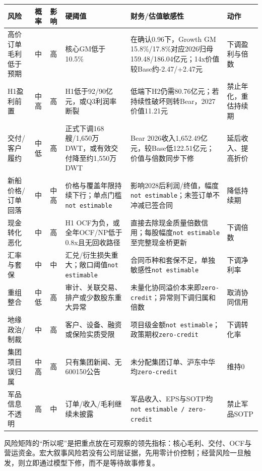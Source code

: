 \begin{exhibitbox}[风险热度与估值传导]
\scriptsize
\begin{tabularx}{\exhibitboxwidth}{L{2.3cm}C{1.2cm}C{1.2cm}L{3.5cm}L{4.0cm}X}
\toprule
\textbf{风险} & \textbf{概率} & \textbf{影响} & \textbf{硬阈值} & \textbf{财务/估值敏感性} & \textbf{动作} \\
\midrule
高价订单毛利低于预期 & 中 & 高 & 核心GM低于10.5\% & 在确认0.96下，Growth GM 15.8\%/17.8\%对应2026归母159.48/186.04亿元；14x价值较Base约-2.47/+2.47元 & 下调盈利与倍数 \\
H1盈利前置 & 中高 & 高 & H1低于92/90亿元，或Q3利润率断裂 & 低端下H2仍需80.76亿元；若持续性破坏则转Bear，2027价值11.21元 & 禁止年化，重估持续期 \\
交付/客户履约 & 中低 & 高 & 正式下调168艘/1,650万DWT，或有效交付降至约1,550万DWT & Bear 2026收入1,652.49亿元，较Base低122.51亿元；价值与倍数同步下修 & 延后收入、提高折价 \\
新船价格/订单回落 & 中 & 中高 & 价格与覆盖年限持续下行；单点门槛\texttt{not estimable} & 影响2028后利润/终值，幅度\texttt{not estimable}；未签订单不冲减已签合同 & 降低持续期 \\
现金转化恶化 & 中 & 高 & H1 OCF为负，或全年OCF/NP低于0.8x且无回收路径 & 直接去除现金质量倍数信用；每股幅度\texttt{not estimable}至完整现金桥更新 & 下调倍数 \\
汇率与套保 & 中 & 中 & 汇兑/衍生损失重大；敞口阈值\texttt{not estimable} & 合同币种和套保不足，单独敏感性\texttt{not estimable} & 下调净利率 \\
重组整合 & 中低 & 高 & 审计、关联交易、排产或少数股东重大异常 & 未量化协同溢价本来即\texttt{zero-credit}；异常则下调归属和倍数 & 取消协同信用 \\
地缘政治/制裁 & 中 & 高 & 客户、设备、融资或保险实质受限 & 项目级金额\texttt{not estimable}；政策期权\texttt{zero-credit} & 下调转化率 \\
集团项目误归属 & 中高 & 高 & 只有集团新闻、无600150公告 & 未分配集团订单、沪东中华均\texttt{zero-credit} & 维持0 \\
军品信息不透明 & 高 & 中 & 订单/收入/毛利继续未披露 & 军品收入、EPS与SOTP均\texttt{not estimable / zero-credit} & 禁止军品SOTP \\
\bottomrule
\end{tabularx}
\end{exhibitbox}

风险矩阵的“所以呢”是把重点放在可观察的领先指标：核心毛利、交付、OCF与营运资金。宏大叙事风险若没有公司层证据，先用零计价控制；经营风险一旦触发，则立即通过模型下修，而不是等待故事修复。

